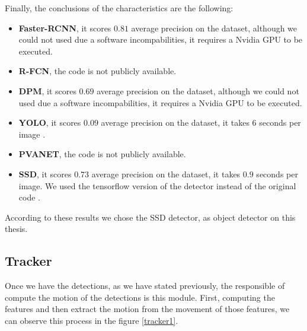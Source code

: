 \documentclass[12pt, a4paper, titlepage,twoside,openright]{article}
\begin{document}

Finally, the conclusions of the characteristics are the following:

\begin{itemize}

\item \textbf{Faster-RCNN}, it scores $0.81$ average precision on the dataset, although we could not used due a software incompabilities, it requires a Nvidia GPU to be executed.

\item \textbf{R-FCN}, the code is not publicly available.

\item \textbf{DPM}, it scores $0.69$ average precision on the dataset, although we could not used due a software incompabilities, it requires a Nvidia GPU to be executed.

\item \textbf{YOLO}, it scores $0.09$ average precision on the dataset, it takes $6$ seconds per image \cite{yoloDark}. 

\item \textbf{PVANET}, the code is not publicly available.

\item \textbf{SSD}, it scores $0.73$ average precision on the dataset, it takes $0.9$ seconds per image. We used the tensorflow version of the detector \cite{ssdCode} instead of the original code \cite{ssdCode2}.


\end{itemize}

According to these results we chose the SSD detector, as object detector on this thesis.


\subsection{Tracker}

Once we have the detections, as we have stated previously, the responsible of compute the motion of the detections is this module. First, computing the features and then extract the motion from the movement of those features, we can observe this process in the figure \ref{tracker1}.
\end{document}
